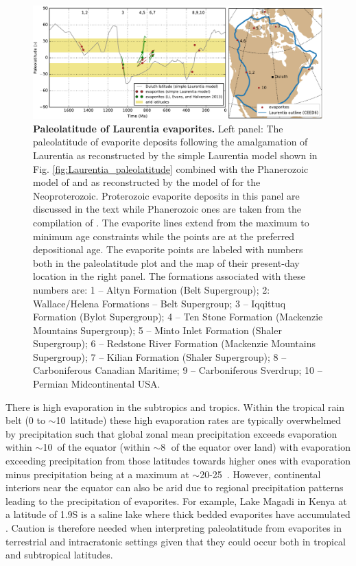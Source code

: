 \documentclass[twocolumn, switch]{article} %
\begin{document}
\begin{figure}
\centering
\includegraphics[width=\textwidth]{../Figures/Laurentia_evaporite_figure.pdf}
\caption{\textbf{Paleolatitude of Laurentia evaporites.} Left panel: The paleolatitude of evaporite deposits following the amalgamation of Laurentia as reconstructed by the simple Laurentia model shown in Fig. \ref{fig:Laurentia_paleolatitude} combined with the Phanerozoic model of \cite{Torsvik2017a} and as reconstructed by the model of \cite{Li2013a} for the Neoproterozoic. Proterozoic evaporite deposits in this panel are discussed in the text while Phanerozoic ones are taken from the compilation of \cite{Evans2006a}. The evaporite lines extend from the maximum to minimum age constraints while the points are at the preferred depositional age. The evaporite points are labeled with numbers both in the paleolatitude plot and the map of their present-day location in the right panel. The formations associated with these numbers are: 1 -- Altyn Formation (Belt Supergroup); 2: Wallace/Helena Formations -- Belt Supergroup; 3 -- Iqqittuq Formation (Bylot Supergroup); 4 -- Ten Stone Formation (Mackenzie Mountains Supergroup); 5 -- Minto Inlet Formation (Shaler Supergroup); 6 -- Redstone River Formation (Mackenzie Mountains Supergroup); 7 -- Kilian Formation (Shaler Supergroup); 8 -- Carboniferous Canadian Maritime; 9 -- Carboniferous Sverdrup; 10 -- Permian Midcontinental USA.}
\label{fig:Laurentia_evaporites}
\end{figure}

There is high evaporation in the subtropics and tropics. Within the tropical rain belt (0 to $\sim$10\textdegree\ latitude) these high evaporation rates are typically overwhelmed by precipitation such that global zonal mean precipitation exceeds evaporation within $\sim$10\textdegree\ of the equator (within $\sim$8\textdegree$\;$ of the equator over land) with evaporation exceeding precipitation from those latitudes towards higher ones with evaporation minus precipitation being at a maximum at $\sim$20-25\textdegree\ \citep{Park2020b}. However, continental interiors near the equator can also be arid due to regional precipitation patterns leading to the precipitation of evaporites. For example, Lake Magadi in Kenya at a latitude of 1.9\textdegree S is a saline lake where thick bedded evaporites have accumulated \citep{Eugster1980a}. Caution is therefore needed when interpreting paleolatitude from evaporites in terrestrial and intracratonic settings given that they could occur both in tropical and subtropical latitudes.
\end{document}
